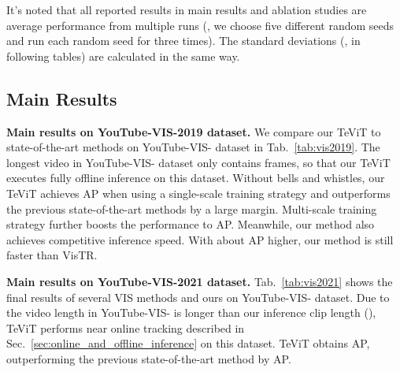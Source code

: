 \documentclass[10pt,twocolumn,letterpaper]{article}
\begin{document}
It's noted that all reported results in main results and ablation studies are average performance from multiple runs (\ie, we choose five different random seeds and run each random seed for three times). The standard deviations (\ie,  in following tables) are calculated in the same way.

\subsection{Main Results}

\noindent\textbf{Main results on YouTube-VIS-2019 dataset.} We compare our TeViT to state-of-the-art methods on YouTube-VIS- dataset in Tab.~\ref{tab:vis2019}. The longest video in YouTube-VIS- dataset only contains  frames, so that our TeViT executes fully offline inference on this dataset. Without bells and whistles, our TeViT achieves  AP when using a single-scale training strategy and outperforms the previous state-of-the-art methods by a large margin. Multi-scale training strategy further boosts the performance to  AP. Meanwhile, our method also achieves competitive inference speed. With about  AP higher, our method is still faster than VisTR.

\noindent\textbf{Main results on YouTube-VIS-2021 dataset.}
Tab.~\ref{tab:vis2021} shows the final results of several VIS methods and ours on YouTube-VIS- dataset. Due to the video length in YouTube-VIS- is longer than our inference clip length (), TeViT performs near online tracking described in Sec.~\ref{sec:online_and_offline_inference} on this dataset. TeViT obtains  AP, outperforming the previous state-of-the-art method by  AP.
\end{document}
